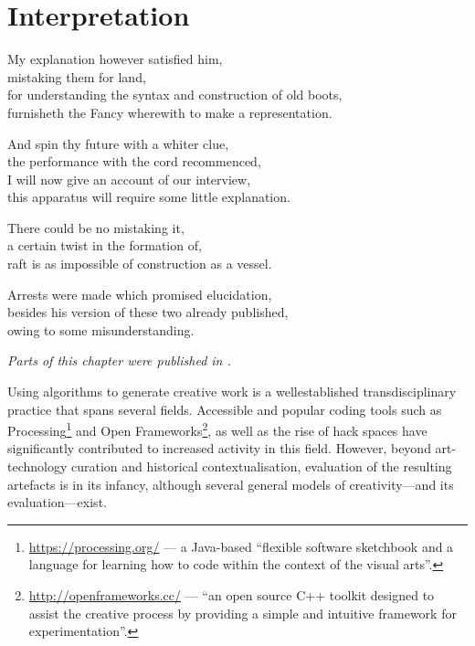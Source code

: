 
\chapter{Interpretation}
\label{ch:interpretation}

\startcontents[chapters]

\vfill

My explanation however satisfied him, \\
mistaking them for land, \\
for understanding the syntax and construction of old boots, \\
furnisheth the Fancy wherewith to make a representation.

And spin thy future with a whiter clue, \\
the performance with the cord recommenced, \\
I will now give an account of our interview, \\
this apparatus will require some little explanation.

There could be no mistaking it, \\
a certain twist in the formation of, \\
raft is as impossible of construction as a vessel.

Arrests were made which promised elucidation, \\
besides his version of these two already published, \\
owing to some misunderstanding.

\newpage
\minicontents
\spirals

\emph{Parts of this chapter were published in \autocite{Raczinski2016}.}

\spirals


Using algorithms to generate creative work is a wellestablished transdisciplinary practice that spans several fields. Accessible and popular coding tools such as Processing\footnote{\url{https://processing.org/} --- a Java-based ``flexible software sketchbook and a language for learning how to code within the context of the visual arts''.} and Open Frameworks\footnote{\url{http://openframeworks.cc/} --- ``an open source C++ toolkit designed to assist the creative process by providing a simple and intuitive framework for experimentation''.}, as well as the rise of hack spaces have significantly contributed to increased activity in this field. However, beyond art-technology curation and historical contextualisation, evaluation of the resulting artefacts is in its infancy, although several general models of creativity---and its evaluation---exist.

